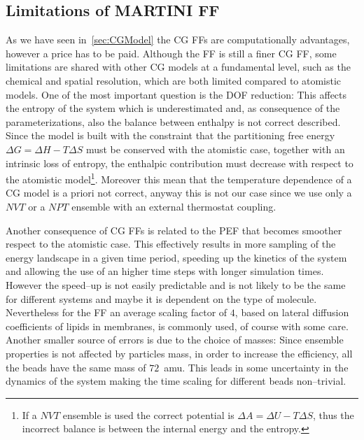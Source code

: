 \subsection{Limitations of MARTINI FF}
As we have seen in~\ref{sec:CGModel} the \ac{CG} \acp{FF} are computationally advantages, however a price has to be paid. Although the \martini \ac{FF} is still a finer \ac{CG} \ac{FF}, some limitations are shared with other \ac{CG} models at a fundamental level, such as the chemical and spatial resolution, which are both limited compared to atomistic models. One of the most important question is the \ac{DOF} reduction: This affects the entropy of the system which is underestimated and, as consequence of the \martini parameterizations, also the balance between enthalpy is not correct described. Since the \martini model is built with the constraint that the partitioning free energy $\Delta G = \Delta H - T\Delta S$ must be conserved with the atomistic case, together with an intrinsic loss of entropy, the enthalpic contribution must decrease with respect to the atomistic model\footnote{If a $NVT$ ensemble is used the correct potential is $\Delta A = \Delta U - T\Delta S$, thus the incorrect balance is between the internal energy and the entropy.}. Moreover this mean that the temperature dependence of a \ac{CG} model is a priori not correct, anyway this is not our case since we use only a $NVT$ or a $NPT$ ensemble with an external thermostat coupling.

Another consequence of \ac{CG} \acp{FF} is related to the \ac{PEF} that becomes smoother respect to the atomistic case. This effectively results in more sampling of the energy landscape in a given time period, speeding up the kinetics of the system and allowing the use of an higher time steps with longer simulation times. However the speed--up is not easily predictable and is not likely to be the same for different systems and maybe it is dependent on the type of molecule. Nevertheless for the \martini \ac{FF} an average scaling factor of $4$, based on lateral diffusion coefficients of lipids in membranes, is commonly used, of course with some care. Another smaller source of errors is due to the choice of masses: Since ensemble properties is not affected by particles mass, in order to increase the efficiency, all the \martini beads have the same mass of $72$~amu. This leads in some uncertainty in the dynamics of the system making the time scaling for different beads non--trivial.

